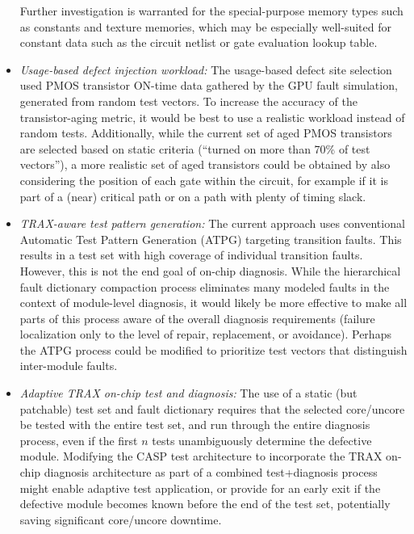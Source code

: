 \begin{itemize}
{%
Further investigation is warranted for the special-purpose memory types such as constants and texture memories, which may be especially well-suited for constant data such as the circuit netlist or gate evaluation lookup table.}
\item{\textit{Usage-based defect injection workload:} The usage-based defect site selection used PMOS transistor ON-time data gathered by the GPU fault simulation, generated from random test vectors.
%
To increase the accuracy of the transistor-aging metric, it would be best to use a realistic workload instead of random tests.
%
Additionally, while the current set of aged PMOS transistors are selected based on static criteria (``turned on more than 70\% of test vectors''), a more realistic set of aged transistors could be obtained by also considering the position of each gate within the circuit, for example if it is part of a (near) critical path or on a path with plenty of timing slack.}
\item{\textit{TRAX-aware test pattern generation:} The current approach uses conventional Automatic Test Pattern Generation (ATPG) targeting transition faults.
%
This results in a test set with high coverage of individual transition faults.
%
However, this is not the end goal of on-chip diagnosis.
%
While the hierarchical fault dictionary compaction process eliminates many modeled faults in the context of module-level diagnosis, it would likely be more effective to make all parts of this process aware of the overall diagnosis requirements (failure localization only to the level of repair, replacement, or avoidance).
%
Perhaps the ATPG process could be modified to prioritize test vectors that distinguish inter-module faults.}
\item{\textit{Adaptive TRAX on-chip test and diagnosis:} The use of a static (but patchable) test set and fault dictionary requires that the selected core/uncore be tested with the entire test set, and run through the entire diagnosis process, even if the first $n$ tests unambiguously determine the defective module.
%
Modifying the CASP test architecture to incorporate the TRAX on-chip diagnosis architecture as part of a combined test+diagnosis process might enable adaptive test application, or provide for an early exit if the defective module becomes known before the end of the test set, potentially saving significant core/uncore downtime.}
\end{itemize}

